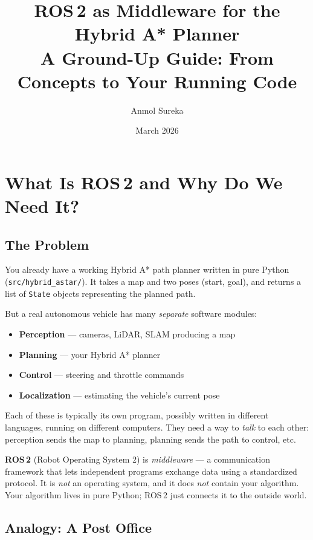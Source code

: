 \documentclass[12pt, a4paper]{article}
\title{%
    \vspace{-1cm}
    \textbf{ROS\,2 as Middleware for the Hybrid A* Planner}\\[0.5em]
    \large A Ground-Up Guide: From Concepts to Your Running Code
}
\author{Anmol Sureka}
\date{March 2026}
\begin{document}
\maketitle
\tableofcontents
\newpage

\section{What Is ROS\,2 and Why Do We Need It?}

\subsection{The Problem}

You already have a working Hybrid A* path planner written in pure Python
(\texttt{src/hybrid\_astar/}).  It takes a map and two poses (start, goal),
and returns a list of \texttt{State} objects representing the planned path.

But a real autonomous vehicle has many \emph{separate} software modules:
\begin{itemize}[nosep]
    \item \textbf{Perception} --- cameras, LiDAR, SLAM producing a map
    \item \textbf{Planning} --- your Hybrid A* planner
    \item \textbf{Control} --- steering and throttle commands
    \item \textbf{Localization} --- estimating the vehicle's current pose
\end{itemize}

Each of these is typically its own program, possibly written in different
languages, running on different computers. They need a way to \emph{talk}
to each other: perception sends the map to planning, planning sends the
path to control, etc.

\begin{keybox}
\textbf{ROS\,2} (Robot Operating System 2) is \emph{middleware} ---
a communication framework that lets independent programs exchange data
using a standardized protocol. It is \emph{not} an operating system,
and it does \emph{not} contain your algorithm. Your algorithm lives in
pure Python; ROS\,2 just connects it to the outside world.
\end{keybox}

\subsection{Analogy: A Post Office}
\end{document}
